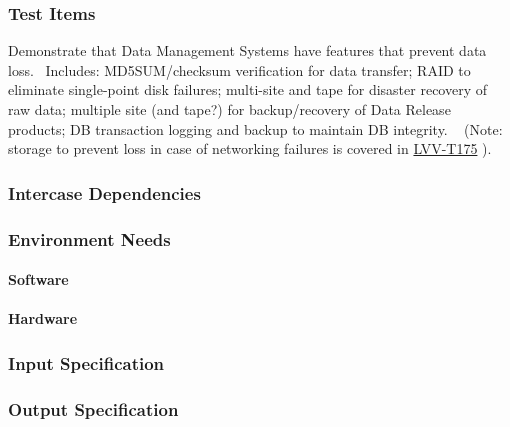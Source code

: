 \subsubsection{Test Items}
Demonstrate that Data Management Systems have features that prevent data
loss. ~Includes: MD5SUM/checksum verification for data transfer; RAID to
eliminate single-point disk failures; multi-site and tape for disaster
recovery of raw data; multiple site (and tape?) for backup/recovery of
Data Release products; DB transaction logging and backup to maintain DB
integrity. ~ (Note: storage to prevent loss in case of networking
failures is covered in
\href{https://jira.lsstcorp.org/secure/Tests.jspa\#/testCase/LVV-T175}{LVV-T175}
). ~~



\subsubsection{Intercase Dependencies}

\subsubsection{Environment Needs}

\paragraph{Software}

\paragraph{Hardware}

\subsubsection{Input Specification}

\subsubsection{Output Specification}

